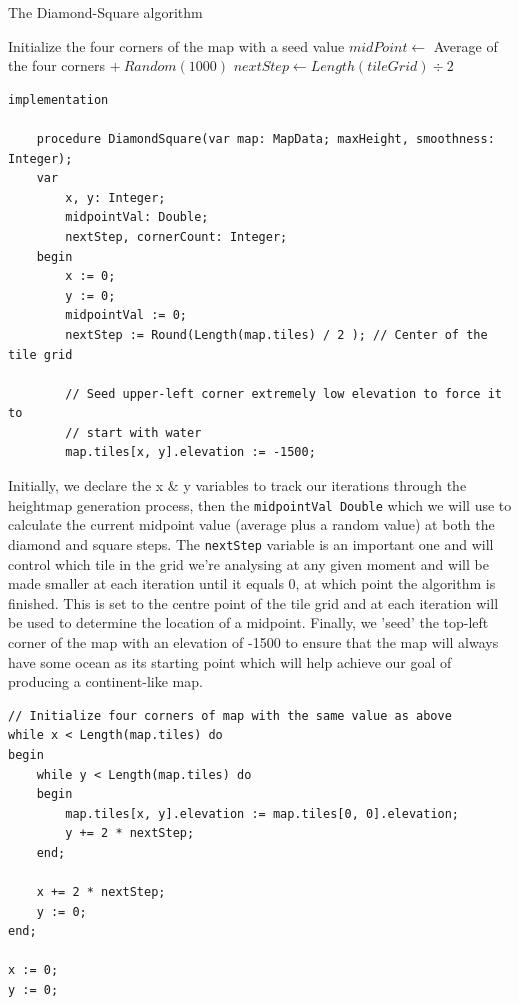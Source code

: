 \documentclass{article}
\begin{document}
\begin{algorithm}
\caption{The Diamond-Square algorithm}

\begin{algorithmic}
	\State Initialize the four corners of the map with a seed value
	\State $midPoint \gets$ Average of the four corners $+ \ Random(1000)$
	\State $nextStep \gets Length(tileGrid) \div 2$
	
		
	\EndWhile
	
\EndProcedure	
\end{algorithmic}
\end{algorithm}



\begin{verbatim}
implementation

	procedure DiamondSquare(var map: MapData; maxHeight, smoothness: Integer);
	var
		x, y: Integer;
		midpointVal: Double;
		nextStep, cornerCount: Integer;
	begin
		x := 0;
		y := 0;
		midpointVal := 0;
		nextStep := Round(Length(map.tiles) / 2 ); // Center of the tile grid

		// Seed upper-left corner extremely low elevation to force it to
		// start with water
		map.tiles[x, y].elevation := -1500;
\end{verbatim}

Initially, we declare the x \& y variables to track our iterations through the heightmap generation process, then the \texttt{midpointVal Double} which we will use to calculate the current midpoint value (average plus a random value) at both the diamond and square steps. The \texttt{nextStep} variable is an important one and will control which tile in the grid we're analysing at any given moment and will be made smaller at each iteration until it equals 0, at which point the algorithm is finished. This is set to the centre point of the tile grid and at each iteration will be used to determine the location of a midpoint. Finally, we 'seed' the top-left corner of the map with an elevation of -1500 to ensure that the map will always have some ocean as its starting point which will help achieve our goal of producing a continent-like map.

\begin{verbatim}
// Initialize four corners of map with the same value as above
while x < Length(map.tiles) do
begin
	while y < Length(map.tiles) do
	begin
		map.tiles[x, y].elevation := map.tiles[0, 0].elevation;
		y += 2 * nextStep;
	end;

	x += 2 * nextStep;
	y := 0;
end;

x := 0;
y := 0;
\end{verbatim}

\printbibliography
	
\end{document}
